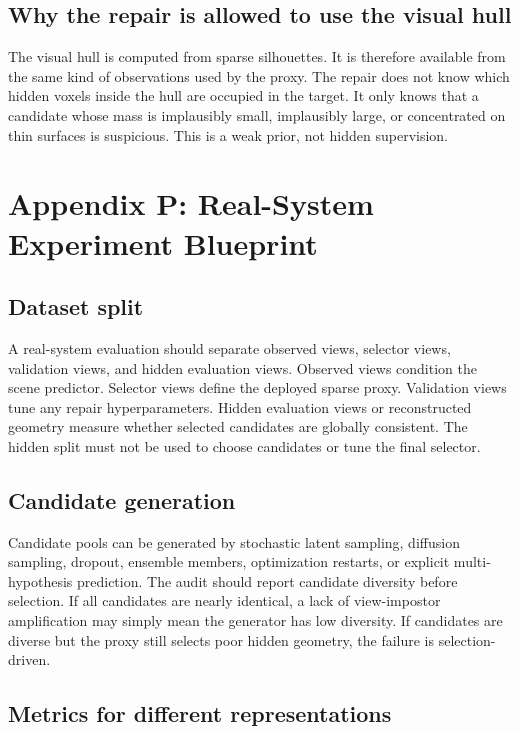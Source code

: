 \documentclass{article}
\begin{document}
\subsection{Why the repair is allowed to use the visual hull}

The visual hull is computed from sparse silhouettes. It is therefore available
from the same kind of observations used by the proxy. The repair does not know
which hidden voxels inside the hull are occupied in the target. It only knows
that a candidate whose mass is implausibly small, implausibly large, or
concentrated on thin surfaces is suspicious. This is a weak prior, not hidden
supervision.

\section{Appendix P: Real-System Experiment Blueprint}

\subsection{Dataset split}

A real-system evaluation should separate observed views, selector views,
validation views, and hidden evaluation views. Observed views condition the
scene predictor. Selector views define the deployed sparse proxy. Validation
views tune any repair hyperparameters. Hidden evaluation views or reconstructed
geometry measure whether selected candidates are globally consistent. The
hidden split must not be used to choose candidates or tune the final selector.

\subsection{Candidate generation}

Candidate pools can be generated by stochastic latent sampling, diffusion
sampling, dropout, ensemble members, optimization restarts, or explicit
multi-hypothesis prediction. The audit should report candidate diversity before
selection. If all candidates are nearly identical, a lack of view-impostor
amplification may simply mean the generator has low diversity. If candidates
are diverse but the proxy still selects poor hidden geometry, the failure is
selection-driven.

\subsection{Metrics for different representations}
\end{document}
